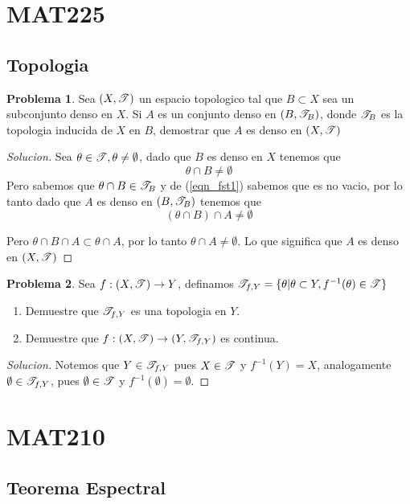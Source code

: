\documentclass{article}
\theoremstyle{definition}
\newtheorem{problem}{Problema}
\newenvironment{solution}{\begin{proof}[Solucion]}{\end{proof}}
\begin{document}
\section{MAT225}
\subsection{Topologia}
\begin{problem}
  Sea $(X, \mathscr{T})$ un espacio topologico tal que $B \subset X$ sea un subconjunto denso en $X$. Si
  $A$ es un conjunto denso en $(B, \mathscr{T}_{B})$, donde $\mathscr{T}_{B}$ es la topologia inducida de $X$ en $B$, demostrar que $A$ es denso en $(X, \mathscr{T})$
\end{problem}
\begin{solution}
  Sea $\theta \in \mathscr{T}, \theta \neq \emptyset$, dado que $B$ es denso en $X$ tenemos que
  \begin{equation}
    \label{eqn_fst1}
    \theta \cap B \neq \emptyset
  \end{equation}
  Pero sabemos que $\theta \cap B \in \mathscr{T}_{B}$ y de (\ref{eqn_fst1}) sabemos que es no vacio, por lo tanto dado que $A$ es denso en $(B, \mathscr{T}_{B})$ tenemos que
  \begin{equation*}
    (\theta \cap B) \cap A \neq \emptyset
  \end{equation*}

  Pero $\theta \cap B \cap A \subset \theta \cap A$, por lo tanto $\theta \cap A \neq \emptyset$.
  Lo que significa que $A$ es denso en $(X, \mathscr{T})$
\end{solution}

\begin{problem}
  Sea $f : (X, \mathscr{T}) \to Y$, definamos $\mathscr{T}_{f, Y} = \{\theta | \theta \subset Y, f^{-1}(\theta) \in \mathscr{T}\}$
  \begin{enumerate}
    \item Demuestre que $\mathscr{T}_{f, Y}$ es una topologia en $Y$.
    \item Demuestre que $f: (X, \mathscr{T}) \to (Y, \mathscr{T}_{f, Y})$ es continua.
  \end{enumerate}
\end{problem}
\begin{solution}
  Notemos que $Y \in \mathscr{T}_{f, Y}$ pues $X \in \mathscr{T}$ y $f^{-1}(Y) = X$, analogamente $\emptyset \in \mathscr{T}_{f, Y}$, pues $\emptyset \in \mathscr{T}$ y $f^{-1}(\emptyset) = \emptyset$.
\end{solution}

\section{MAT210}
\subsection{Teorema Espectral}
\end{document}
